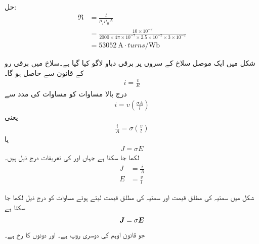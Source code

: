 حل:
\begin{align*}
\Re& = \frac{l}{\mu_r \mu_0 A}\\
&=\frac{10\times 10^{-2}}{2000 \times 4 \pi \times 10^{-7} \times 2.5 \times 10^{-2} \times 3 \times 10^{-2}}\\
&=\SI{53052}{\ampere \cdot turns \per \weber}
\end{align*}

شکل   میں ایک موصل سلاخ کے سروں پر برقی دباو    لاگو کیا گیا ہے۔سلاخ میں  برقی رو    کے قانون  سے حاصل ہو گا۔
\begin{align}
i=\frac{v}{R}
\end{align}
درج بالا مساوات کو مساوات   کی مدد سے
\begin{align}
i=v \left(\frac{\sigma A}{l}\right)
\end{align}
یعنی
\begin{align}
\frac{i}{A}=\sigma \left(\frac{v}{l} \right)
\end{align}
یا
\begin{align}\label{مساوات_مقناطیسی_دور_اوہم_قانون_کی_تفرق_شکل}
J =\sigma E
\end{align}
لکھا جا سکتا ہے جہاں   اور  کی تعریفات درج ذیل ہیں۔
\begin{align}
J&=\frac{i}{A} \label{مساوات_مقناطیسی_دور_کثافت_رو}\\
E&=\frac{v}{l} \label{مساوات_مقناطیسی_دور_برقی_شدت}
\end{align}

شکل   میں سمتیہ  کی مطلق قیمت   اور سمتیہ  کی مطلق قیمت  لیتے ہوئے  مساوات  کو درج ذیل لکھا جا سکتا ہے
\begin{align}
{\ensuremath{{\boldsymbol{J}}}}=\sigma {\ensuremath{{\boldsymbol{E}}}}
\end{align}
جو قانون اوہم کی دوسری روپ ہے۔  اور  دونوں کا رخ    ہے۔

